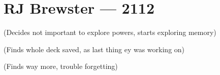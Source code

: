 \hypertarget{rj-brewster-2112}{%
\chapter*{RJ Brewster — 2112}\label{rj-brewster-2112}}

(Decides not important to explore powers, starts exploring memory)

(Finds whole deck saved, as last thing ey was working on)

(Finds way more, trouble forgetting)
